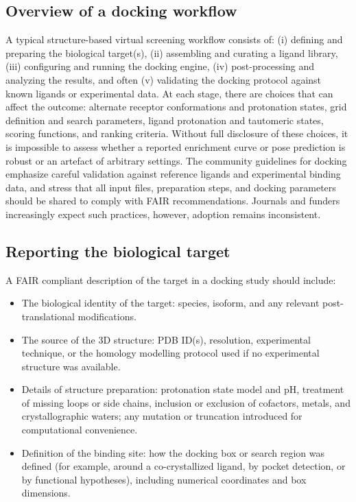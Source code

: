 \documentclass[12pt]{article}
\begin{document}
\subsection{Overview of a docking workflow}

A typical structure-based virtual screening workflow consists of: (i) defining and preparing the biological target(s), (ii) assembling and curating a ligand library, (iii) configuring and running the docking engine, (iv) post-processing and analyzing the results, and often (v) validating the docking protocol against known ligands or experimental data.\cite{CH12_plos2025tenDocking,CH12_rigorRepro2020} At each stage, there are choices that can affect the outcome: alternate receptor conformations and protonation states, grid definition and search parameters, ligand protonation and tautomeric states, scoring functions, and ranking criteria. Without full disclosure of these choices, it is impossible to assess whether a reported enrichment curve or pose prediction is robust or an artefact of arbitrary settings. The community guidelines for docking emphasize careful validation against reference ligands and experimental binding data, and stress that all input files, preparation steps, and docking parameters should be shared to comply with FAIR recommendations.\cite{CH12_plos2025tenDocking,CH12_toolsRepro2016,CH12_reproWorkflows2017} Journals and funders increasingly expect such practices, however, adoption remains inconsistent.

\subsection{Reporting the biological target}

A FAIR compliant description of the target in a docking study should include:

\begin{itemize}
  \item The biological identity of the target: species, isoform, and any relevant post-translational modifications.
  \item The source of the 3D structure: PDB ID(s), resolution, experimental technique, or the homology modelling protocol used if no experimental structure was available.
  \item Details of structure preparation: protonation state model and pH, treatment of missing loops or side chains, inclusion or exclusion of cofactors, metals, and crystallographic waters; any mutation or truncation introduced for computational convenience.
  \item Definition of the binding site: how the docking box or search region was defined (for example, around a co-crystallized ligand, by pocket detection, or by functional hypotheses), including numerical coordinates and box dimensions.
\end{itemize}
\end{document}
